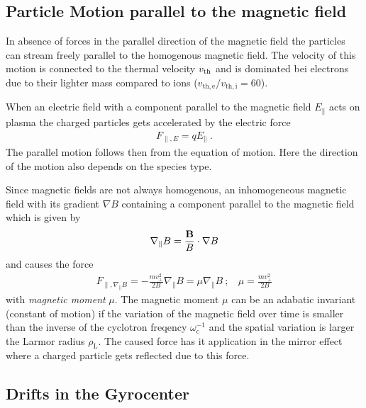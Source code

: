 \newpage

\subsection{Particle Motion parallel to the magnetic field}
\label{sub:parallelmotion}

In absence of forces in the parallel direction of the magnetic field the particles can stream freely parallel to the homogenous magnetic field. The velocity of this motion is connected to the thermal velocity $v_{\mathrm{th}}$ and is dominated bei electrons due to their lighter mass compared to ions ($v_\mathrm{th,e}/v_\mathrm{th,i} = 60$). 

When an electric field with a component parallel to the magnetic field $E_\parallel$ acts on plasma the charged particles gets accelerated by the electric force
\begin{gather}
    F_{\parallel,E} = qE_\parallel~.
\end{gather}
The parallel motion follows then from the equation of motion. Here the direction of the motion also depends on the species type.\\\bigskip

Since magnetic fields are not always homogenous, an inhomogeneous magnetic field with its gradient $\nabla B$ containing a component parallel to the magnetic field which is given by
\begin{gather}
    \nabla_\parallel B = \frac{\boldsymbol{\mathbf{B}}}{B} \cdot \nabla B 
\end{gather}
and causes the force
\begin{gather}
    F_{\parallel,\nabla_\parallel B} = - \frac{mv^2_{\perp}}{2B} \nabla_\parallel B = \mu \nabla_\parallel B~;~~~~\mu = \frac{mv^2_{\perp}}{2B}
\end{gather}
with \textit{magnetic moment} $\mu$. The magnetic moment $\mu$ can be an adabatic invariant (constant of motion) if the variation of the magnetic field over time is smaller than the inverse of the cyclotron freqency $\omega^{-1}_\mathrm{c}$ and the spatial variation is larger the Larmor radius $\rho_\mathrm{L}$. The caused force has it application in the mirror effect where a charged particle gets reflected due to this force. \cite{Wesson2011}

\newpage

\subsection{Drifts in the Gyrocenter}
\label{sub:drift}

